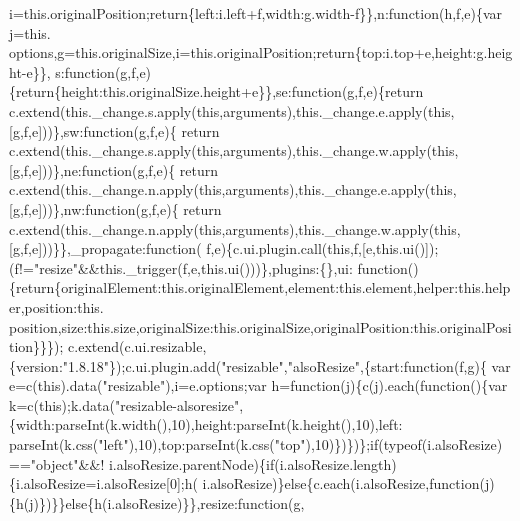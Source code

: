 \begin{DoxyCode}
      i=this.originalPosition;\textcolor{keywordflow}{return}\{left:i.left+f,width:g.width-f\}\},n:\textcolor{keyword}{function}(h,f,e)\{var j=this.
      options,g=this.originalSize,i=this.originalPosition;\textcolor{keywordflow}{return}\{top:i.top+e,height:g.height-e\}\},
      s:\textcolor{keyword}{function}(g,f,e)\{\textcolor{keywordflow}{return}\{height:this.originalSize.height+e\}\},se:\textcolor{keyword}{function}(g,f,e)\{\textcolor{keywordflow}{return} 
      c.extend(this.\_change.s.apply(\textcolor{keyword}{this},arguments),this.\_change.e.apply(\textcolor{keyword}{this},[g,f,e]))\},sw:\textcolor{keyword}{function}(g,f,e)\{\textcolor{keywordflow}{
      return} c.extend(this.\_change.s.apply(\textcolor{keyword}{this},arguments),this.\_change.w.apply(\textcolor{keyword}{this},[g,f,e]))\},ne:\textcolor{keyword}{function}(g,f,e)\{\textcolor{keywordflow}{
      return} c.extend(this.\_change.n.apply(\textcolor{keyword}{this},arguments),this.\_change.e.apply(\textcolor{keyword}{this},[g,f,e]))\},nw:\textcolor{keyword}{function}(g,f,e)\{\textcolor{keywordflow}{
      return} c.extend(this.\_change.n.apply(\textcolor{keyword}{this},arguments),this.\_change.w.apply(\textcolor{keyword}{this},[g,f,e]))\}\},\_propagate:\textcolor{keyword}{function}(
      f,e)\{c.ui.plugin.call(\textcolor{keyword}{this},f,[e,this.ui()]);(f!=\textcolor{stringliteral}{"resize"}&&this.\_trigger(f,e,this.ui()))\},plugins:\{\},ui:\textcolor{keyword}{
      function}()\{\textcolor{keywordflow}{return}\{originalElement:this.originalElement,element:this.element,helper:this.helper,position:this.
      position,size:this.size,originalSize:this.originalSize,originalPosition:this.originalPosition\}\}\});
      c.extend(c.ui.resizable,\{version:\textcolor{stringliteral}{"1.8.18"}\});c.ui.plugin.add(\textcolor{stringliteral}{"resizable"},\textcolor{stringliteral}{"alsoResize"},\{start:\textcolor{keyword}{function}(f,g)\{
      var e=c(\textcolor{keyword}{this}).data(\textcolor{stringliteral}{"resizable"}),i=e.options;var h=\textcolor{keyword}{function}(j)\{c(j).each(\textcolor{keyword}{function}()\{var 
      k=c(\textcolor{keyword}{this});k.data(\textcolor{stringliteral}{"resizable-alsoresize"},\{width:parseInt(k.width(),10),height:parseInt(k.height(),10),left:
      parseInt(k.css(\textcolor{stringliteral}{"left"}),10),top:parseInt(k.css(\textcolor{stringliteral}{"top"}),10)\})\})\};\textcolor{keywordflow}{if}(typeof(i.alsoResize)==\textcolor{stringliteral}{"object"}&&!
      i.alsoResize.parentNode)\{\textcolor{keywordflow}{if}(i.alsoResize.length)\{i.alsoResize=i.alsoResize[0];h(
      i.alsoResize)\}\textcolor{keywordflow}{else}\{c.each(i.alsoResize,\textcolor{keyword}{function}(j)\{h(j)\})\}\}\textcolor{keywordflow}{else}\{h(i.alsoResize)\}\},resize:\textcolor{keyword}{function}(g,

\end{DoxyCode}
